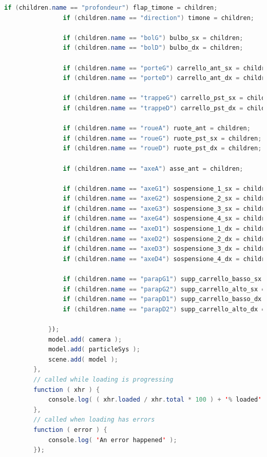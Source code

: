\documentclass{article}
\begin{document}
\begin{lstlisting}[language=Java, caption=Bombardier-415 loader]
                if (children.name == "profondeur") flap_timone = children;
                if (children.name == "direction") timone = children;

                if (children.name == "bolG") bulbo_sx = children;
                if (children.name == "bolD") bulbo_dx = children;

                if (children.name == "porteG") carrello_ant_sx = children;
                if (children.name == "porteD") carrello_ant_dx = children;

                if (children.name == "trappeG") carrello_pst_sx = children;
                if (children.name == "trappeD") carrello_pst_dx = children;

                if (children.name == "roueA") ruote_ant = children;
                if (children.name == "roueG") ruote_pst_sx = children;
                if (children.name == "roueD") ruote_pst_dx = children;

                if (children.name == "axeA") asse_ant = children;

                if (children.name == "axeG1") sospensione_1_sx = children;
                if (children.name == "axeG2") sospensione_2_sx = children;
                if (children.name == "axeG3") sospensione_3_sx = children;
                if (children.name == "axeG4") sospensione_4_sx = children;
                if (children.name == "axeD1") sospensione_1_dx = children;
                if (children.name == "axeD2") sospensione_2_dx = children;
                if (children.name == "axeD3") sospensione_3_dx = children;
                if (children.name == "axeD4") sospensione_4_dx = children;

                if (children.name == "parapG1") supp_carrello_basso_sx = children;
                if (children.name == "parapG2") supp_carrello_alto_sx = children;
                if (children.name == "parapD1") supp_carrello_basso_dx = children;
                if (children.name == "parapD2") supp_carrello_alto_dx = children;

            });
            model.add( camera );
            model.add( particleSys );
            scene.add( model );
        },
        // called while loading is progressing
        function ( xhr ) {
            console.log( ( xhr.loaded / xhr.total * 100 ) + '% loaded' );
        },
        // called when loading has errors
        function ( error ) {
            console.log( 'An error happened' );
        });
\end{lstlisting}
\end{document}
